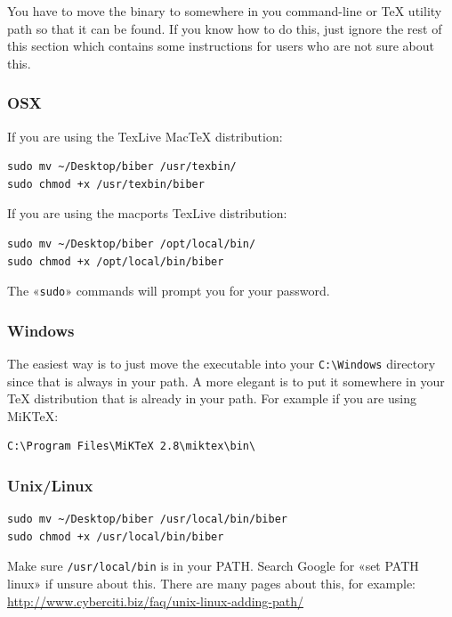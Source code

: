 \documentclass{ltxdockit}
\begin{document}
You have to move the binary to somewhere in you command-line or TeX utility
path so that it can be found. If you know how to do this, just ignore the
rest of this section which contains some instructions for users who are
not sure about this.

\subsubsection{OSX}

If you are using the TexLive MacTeX distribution:

\begin{verbatim}
sudo mv ~/Desktop/biber /usr/texbin/
sudo chmod +x /usr/texbin/biber
\end{verbatim}

\noindent If you are using the macports TexLive distribution:

\begin{verbatim}
sudo mv ~/Desktop/biber /opt/local/bin/
sudo chmod +x /opt/local/bin/biber
\end{verbatim}

\noindent The «\verb+sudo+» commands will prompt you for your password.

\subsubsection{Windows}

The easiest way is to just move the executable into your \verb+C:\Windows+ directory since
that is always in your path. A more elegant is to put it somewhere in
your TeX distribution that is already in your path. For example if you
are using MiKTeX:

\begin{verbatim}
C:\Program Files\MiKTeX 2.8\miktex\bin\
\end{verbatim}

\subsubsection{Unix/Linux}

\begin{verbatim}
sudo mv ~/Desktop/biber /usr/local/bin/biber
sudo chmod +x /usr/local/bin/biber
\end{verbatim}

\noindent Make sure \verb+/usr/local/bin+ is in your PATH. Search Google for «set PATH
linux» if unsure about this. There are many pages about this, for example:
\url{http://www.cyberciti.biz/faq/unix-linux-adding-path/}
\end{document}
